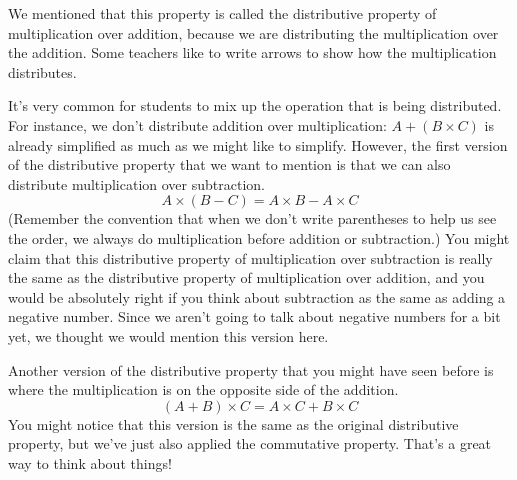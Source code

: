 \documentclass{ximera}
\begin{document}
We mentioned that this property is called the distributive property of multiplication over addition, because we are distributing the multiplication over the addition. Some teachers like to write arrows to show how the multiplication distributes.
\begin{image}
\end{image}
It's very common for students to mix up the operation that is being distributed. For instance, we don't distribute addition over multiplication: $A + (B \times C)$ is already simplified as much as we might like to simplify. However, the first version of the distributive property that we want to mention is that we can also distribute multiplication over subtraction.
\[
A \times (B-C) = A \times B - A \times C
\]
(Remember the convention that when we don't write parentheses to help us see the order, we always do multiplication before addition or subtraction.) You might claim that this distributive property of multiplication over subtraction is really the same as the distributive property of multiplication over addition, and you would be absolutely right if you think about subtraction as the same as adding a negative number. Since we aren't going to talk about negative numbers for a bit yet, we thought we would mention this version here.

Another version of the distributive property that you might have seen before is where the multiplication is on the opposite side of the addition.
\[
(A + B) \times C = A \times C + B \times C
\]
You might notice that this version is the same as the original distributive property, but we've just also applied the commutative property. That's a great way to think about things!
\end{document}
